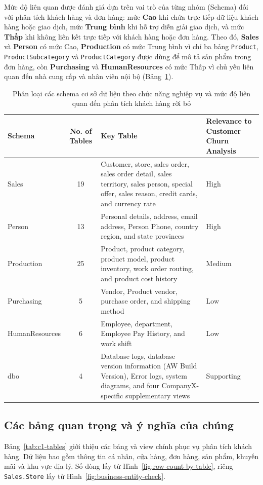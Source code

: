 \documentclass[a4paper,12pt]{article}
\numberwithin{figure}{section}
\numberwithin{table}{section}
\begin{document}
Mức độ liên quan được đánh giá dựa trên vai trò của từng nhóm (Schema) đối với phân tích khách hàng và đơn hàng: mức \textbf{Cao} khi chứa trực tiếp dữ liệu khách hàng hoặc giao dịch, mức \textbf{Trung bình} khi hỗ trợ diễn giải giao dịch, và mức \textbf{Thấp} khi không liên kết trực tiếp với khách hàng hoặc đơn hàng. Theo đó, \textbf{Sales} và \textbf{Person} có mức Cao, \textbf{Production} có mức Trung bình vì chỉ ba bảng \texttt{Product}, \texttt{ProductSubcategory} và \texttt{ProductCategory} được dùng để mô tả sản phẩm trong đơn hàng, còn \textbf{Purchasing} và \textbf{HumanResources} có mức Thấp vì chủ yếu liên quan đến nhà cung cấp và nhân viên nội bộ (Bảng~\ref{tab:c1-schemas}).

\begin{table}[H]
\centering
\caption{Phân loại các schema cơ sở dữ liệu theo chức năng nghiệp vụ và mức độ liên quan đến phân tích khách hàng rời bỏ}
\label{tab:c1-schemas}
\small
\begin{tabularx}{\textwidth}{>{\raggedright\arraybackslash}p{3.0cm} c >{\raggedright\arraybackslash}X >{\raggedright\arraybackslash}p{3.2cm}}
\toprule
\rowcolor{tblhead} \textbf{Schema} & \textbf{No. of Tables} & \textbf{Key Table} & \textbf{Relevance to Customer Churn Analysis} \\
\midrule
Sales & 19 & Customer, store, sales order, sales order detail, sales territory, sales person, special offer, sales reason, credit cards, and currency rate & High \\
Person & 13 & Personal details, address, email address, Person Phone, country region, and state provinces & High \\
Production & 25 & Product, product category, product model, product inventory, work order routing, and product cost history & Medium \\
Purchasing & 5 & Vendor, Product vendor, purchase order, and shipping method & Low \\
HumanResources & 6 & Employee, department, Employee Pay History, and work shift & Low \\
dbo & 4 & Database logs, database version information (AW Build Version), Error logs, system diagrams, and four CompanyX-specific supplementary views & Supporting \\
\bottomrule
\end{tabularx}
\end{table}

\subsection{Các bảng quan trọng và ý nghĩa của chúng}
\label{sec:c1-tables}
Bảng~\ref{tab:c1-tables} giới thiệu các bảng và view chính phục vụ phân tích khách hàng. Dữ liệu bao gồm thông tin cá nhân, cửa hàng, đơn hàng, sản phẩm, khuyến mãi và khu vực địa lý. Số dòng lấy từ Hình~\ref{fig:row-count-by-table}, riêng \texttt{Sales.Store} lấy từ Hình~\ref{fig:business-entity-check}.
\end{document}
